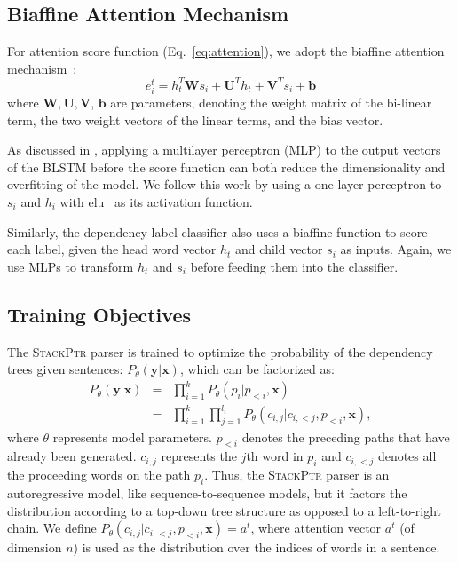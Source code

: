 \documentclass[11pt,a4paper]{article}
\begin{document}
\subsection{Biaffine Attention Mechanism}\label{subsec:attention}
For attention score function (Eq.~\eqref{eq:attention}), we adopt the biaffine attention mechanism~\citep{luong-pham-manning:2015:EMNLP,dozat2017:ICLR}:
\begin{displaymath}
e^{t}_{i} = h_t^T \mathbf{W} s_i + \mathbf{U}^T h_t + \mathbf{V}^T s_i + \mathbf{b}
\end{displaymath}
where $\mathbf{W}, \mathbf{U}, \mathbf{V}$, $\mathbf{b}$ are parameters, denoting the weight matrix of the bi-linear term, the two weight vectors of the linear terms, and the bias vector. 

As discussed in , applying a multilayer perceptron (MLP) to the output vectors of the BLSTM before the score function can both reduce the dimensionality and overfitting of the model. We follow this work by using a one-layer perceptron to $s_i$ and $h_i$ with elu~\cite{clevert2015fast} as its activation function.

Similarly, the dependency label classifier also uses a biaffine function to score each label, given the head word vector $h_t$ and child vector $s_i$ as inputs.
Again, we use MLPs to transform $h_t$ and $s_i$ before feeding them into the classifier.

\subsection{Training Objectives} \label{subsec:prob}
The \textsc{StackPtr} parser is trained to optimize the probability of the dependency trees given sentences: $P_{\theta}(\mathbf{y}|\mathbf{x})$, which can be factorized as:
{\setlength\arraycolsep{2pt}
\begin{equation}\label{eq:prob}
\begin{array}{rcl}
P_{\theta}(\mathbf{y}|\mathbf{x}) & = & \prod\limits_{i=1}^{k} P_{\theta}(p_i|p_{<i},\mathbf{x}) \\
 & = & \prod\limits_{i=1}^{k} \prod\limits_{j=1}^{l_i} P_{\theta}(c_{i,j}|c_{i,<j}, p_{<i},\mathbf{x}),
\end{array}
\end{equation}}where $\theta$ represents model parameters. $p_{<i}$ denotes the preceding paths that have already been generated. $c_{i,j}$ represents the $j$th word in $p_i$ and $c_{i,<j}$ denotes all the proceeding words on the path $p_i$. Thus, the \textsc{StackPtr} parser is an autoregressive model, like sequence-to-sequence models, but it factors the distribution according to a top-down tree structure as opposed to a left-to-right chain.
We define $P_{\theta}(c_{i,j}|c_{i,<j}, p_{<i},\mathbf{x}) = a^t$,
where attention vector $a^t$ (of dimension $n$) is used as the distribution over the indices of words in a sentence.
\end{document}
